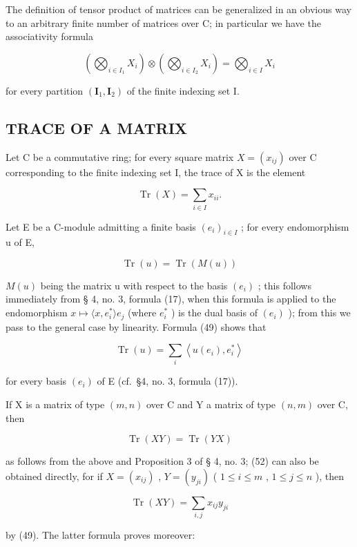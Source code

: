 The definition of tensor product of matrices can be generalized in an obvious way to an arbitrary finite number of matrices over C; in particular we have the associativity formula

\[
\left(\bigotimes_ {i \in I _ {1}} X _ {i}\right) \otimes \left(\bigotimes_ {i \in I _ {2}} X _ {i}\right) = \bigotimes_ {i \in I} X _ {i}\tag{48}
\]

for every partition \((\mathbf{I}_{1}, \mathbf{I}_{2})\) of the finite indexing set I.

\subsection{TRACE OF A MATRIX}

Let C be a commutative ring; for every square matrix \(X = (x_{ij})\) over C corresponding to the finite indexing set I, the trace of X is the element

\[
\operatorname{Tr} (X) = \sum_ {i \in I} x _ {i i}.\tag{49}
\]

Let E be a C-module admitting a finite basis \((e_{i})_{i\in I}\) ; for every endomorphism u of E,

\[
\operatorname{Tr} (u) = \operatorname{Tr} (M (u))\tag{50}
\]

\(M(u)\) being the matrix u with respect to the basis \((e_{i})\) ; this follows immediately from § 4, no. 3, formula (17), when this formula is applied to the endomorphism \(x \mapsto \langle x, e_{i}^{*} \rangle e_{j}\) (where \(e_{i}^{*}\) ) is the dual basis of \((e_{i})\) ); from this we pass to the general case by linearity. Formula (49) shows that

\[
\operatorname{Tr} (u) = \sum_ {i} \left\langle u (e _ {i}), e _ {i} ^ {*} \right\rangle\tag{51}
\]

for every basis \((e_i)\) of E (cf.~§4, no. 3, formula (17)).

If X is a matrix of type \((m, n)\) over C and Y a matrix of type \((n, m)\) over C, then

\[
\operatorname{Tr} (X Y) = \operatorname{Tr} (Y X)\tag{52}
\]

as follows from the above and Proposition 3 of § 4, no. 3; (52) can also be obtained directly, for if \(X = (x_{ij})\) , \(Y = (y_{ji})\) ( \(1 \leqslant i \leqslant m\) , \(1 \leqslant j \leqslant n\) ), then

\[
\operatorname{Tr} (X Y) = \sum_ {i, j} x _ {i j} y _ {j i}\tag{53}
\]

by (49). The latter formula proves moreover:

